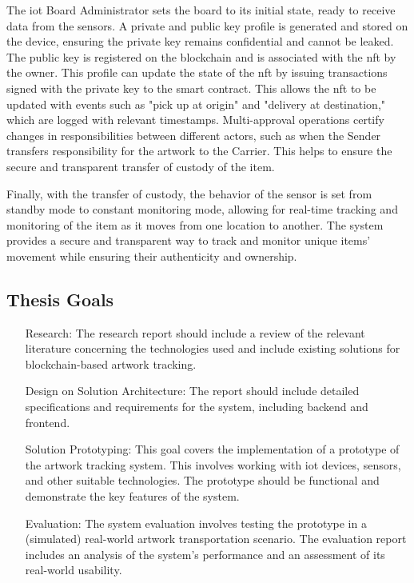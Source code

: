 The \gls{iot} Board Administrator sets the board to its initial state, ready to receive data from the sensors. A private and public key profile is generated and stored on the device, ensuring the private key remains confidential and cannot be leaked. The public key is registered on the blockchain and is associated with the \gls{nft} by the owner. This profile can update the state of the \gls{nft} by issuing transactions signed with the private key to the smart contract. This allows the \gls{nft} to be updated with events such as "pick up at origin" and "delivery at destination," which are logged with relevant timestamps. 
Multi-approval operations certify changes in responsibilities between different actors, such as when the Sender transfers responsibility for the artwork to the Carrier. This helps to ensure the secure and transparent transfer of custody of the item. 

Finally, with the transfer of custody, the behavior of the sensor is set from standby mode to constant monitoring mode, allowing for real-time tracking and monitoring of the item as it moves from one location to another. The system provides a secure and transparent way to track and monitor unique items' movement while ensuring their authenticity and ownership.

\subsection{Thesis Goals}
\label{sec:thesis_goals}
\begin{itemize}[font=\textbf, align=left]
    \item[Research:] The research report should include a review of the relevant literature concerning the technologies used and include existing solutions for blockchain-based artwork tracking.
    \item[Design on Solution Architecture:] The report should include detailed specifications and requirements for the system, including backend and frontend.
    \item[Solution Prototyping:] This goal covers the implementation of a prototype of the artwork tracking system. This involves working with \gls{iot} devices, sensors, and other suitable technologies. The prototype should be functional and demonstrate the key features of the system.
    \item[Evaluation:] The system evaluation involves testing the prototype in a (simulated) real-world artwork transportation scenario. The evaluation report includes an analysis of the system's performance and an assessment of its real-world usability.
\end{itemize}

